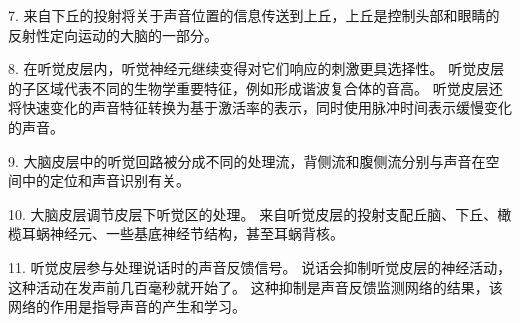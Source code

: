  

7. 来自下丘的投射将关于声音位置的信息传送到上丘，上丘是控制头部和眼睛的反射性定向运动的大脑的一部分。 

8. 在听觉皮层内，听觉神经元继续变得对它们响应的刺激更具选择性。
听觉皮层的子区域代表不同的生物学重要特征，例如形成谐波复合体的音高。
听觉皮层还将快速变化的声音特征转换为基于激活率的表示，同时使用脉冲时间表示缓慢变化的声音。


9. 大脑皮层中的听觉回路被分成不同的处理流，背侧流和腹侧流分别与声音在空间中的定位和声音识别有关。

10. 大脑皮层调节皮层下听觉区的处理。
来自听觉皮层的投射支配丘脑、下丘、橄榄耳蜗神经元、一些基底神经节结构，甚至耳蜗背核。


11. 听觉皮层参与处理说话时的声音反馈信号。
说话会抑制听觉皮层的神经活动，这种活动在发声前几百毫秒就开始了。
这种抑制是声音反馈监测网络的结果，该网络的作用是指导声音的产生和学习。

